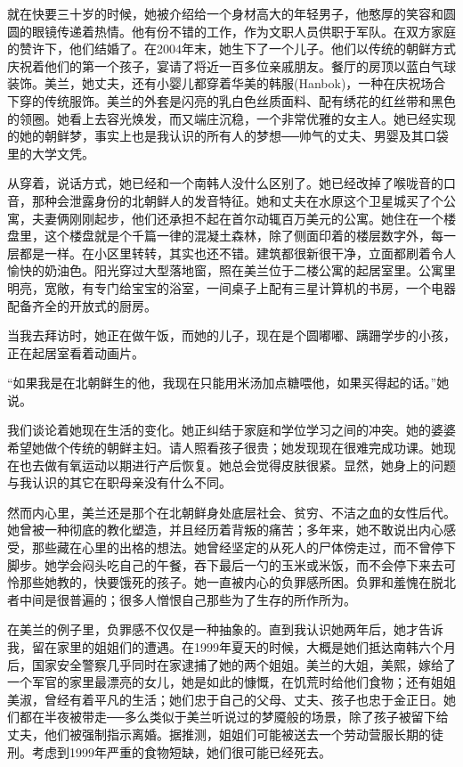 就在快要三十岁的时候，她被介绍给一个身材高大的年轻男子，他憨厚的笑容和圆圆的眼镜传递着热情。他有份不错的工作，作为文职人员供职于军队。在双方家庭的赞许下，他们结婚了。在2004年末，她生下了一个儿子。他们以传统的朝鲜方式庆祝着他们的第一个孩子，宴请了将近一百多位亲戚朋友。餐厅的房顶以蓝白气球装饰。美兰，她丈夫，还有小婴儿都穿着华美的韩服(Hanbok)，一种在庆祝场合下穿的传统服饰。美兰的外套是闪亮的乳白色丝质面料、配有绣花的红丝带和黑色的领圈。她看上去容光焕发，而又端庄沉稳，一个非常优雅的女主人。她已经实现的她的朝鲜梦，事实上也是我认识的所有人的梦想──帅气的丈夫、男婴及其口袋里的大学文凭。

从穿着，说话方式，她已经和一个南韩人没什么区别了。她已经改掉了喉咙音的口音，那种会泄露身份的北朝鲜人的发音特征。她和丈夫在水原这个卫星城买了个公寓，夫妻俩刚刚起步，他们还承担不起在首尔动辄百万美元的公寓。她住在一个楼盘里，这个楼盘就是个千篇一律的混凝土森林，除了侧面印着的楼层数字外，每一层都是一样。在小区里转转，其实也还不错。建筑都很新很干净，立面都刷着令人愉快的奶油色。阳光穿过大型落地窗，照在美兰位于二楼公寓的起居室里。公寓里明亮，宽敞，有专门给宝宝的浴室，一间桌子上配有三星计算机的书房，一个电器配备齐全的开放式的厨房。

当我去拜访时，她正在做午饭，而她的儿子，现在是个圆嘟嘟、蹒跚学步的小孩，正在起居室看着动画片。

“如果我是在北朝鲜生的他，我现在只能用米汤加点糖喂他，如果买得起的话。”她说。

我们谈论着她现在生活的变化。她正纠结于家庭和学位学习之间的冲突。她的婆婆希望她做个传统的朝鲜主妇。请人照看孩子很贵；她发现现在很难完成功课。她现在也去做有氧运动以期进行产后恢复。她总会觉得皮肤很紧。显然，她身上的问题与我认识的其它在职母亲没有什么不同。

然而内心里，美兰还是那个在北朝鲜身处底层社会、贫穷、不洁之血的女性后代。她曾被一种彻底的教化塑造，并且经历着背叛的痛苦；多年来，她不敢说出内心感受，那些藏在心里的出格的想法。她曾经坚定的从死人的尸体傍走过，而不曾停下脚步。她学会闷头吃自己的午餐，吞下最后一勺的玉米或米饭，而不会停下来去可怜那些她教的，快要饿死的孩子。她一直被内心的负罪感所困。负罪和羞愧在脱北者中间是很普遍的；很多人憎恨自己那些为了生存的所作所为。

在美兰的例子里，负罪感不仅仅是一种抽象的。直到我认识她两年后，她才告诉我，留在家里的姐姐们的遭遇。在1999年夏天的时候，大概是她们抵达南韩六个月后，国家安全警察几乎同时在家逮捕了她的两个姐姐。美兰的大姐，美熙，嫁给了一个军官的家里最漂亮的女儿，她是如此的慷慨，在饥荒时给他们食物；还有姐姐美淑，曾经有着平凡的生活；她们忠于自己的父母、丈夫、孩子也忠于金正日。她们都在半夜被带走──多么类似于美兰听说过的梦魇般的场景，除了孩子被留下给丈夫，他们被强制指示离婚。据推测，姐姐们可能被送去一个劳动营服长期的徒刑。考虑到1999年严重的食物短缺，她们很可能已经死去。

